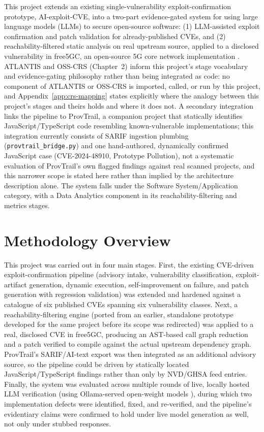 \documentclass[12pt,a4paper]{report}
\begin{document}
This project extends an existing single-vulnerability exploit-confirmation prototype, AI-exploit-CVE, into a two-part evidence-gated system for using large language models (LLMs) to secure open-source software: (1) LLM-assisted exploit confirmation and patch validation for already-published CVEs, and (2) reachability-filtered static analysis on real upstream source, applied to a disclosed vulnerability in free5GC, an open-source 5G core network implementation \cite{free5gc}. ATLANTIS and OSS-CRS (Chapter~2) inform this project's stage vocabulary and evidence-gating philosophy rather than being integrated as code: no component of ATLANTIS or OSS-CRS is imported, called, or run by this project, and Appendix~\ref{app:crs-mapping} states explicitly where the analogy between this project's stages and theirs holds and where it does not. A secondary integration links the pipeline to ProvTrail, a companion project that statically identifies JavaScript/TypeScript code resembling known-vulnerable implementations; this integration currently consists of SARIF ingestion plumbing (\texttt{provtrail\_bridge.py}) and one hand-authored, dynamically confirmed JavaScript case (CVE-2024-48910, Prototype Pollution), not a systematic evaluation of ProvTrail's own flagged findings against real scanned projects, and this narrower scope is stated here rather than implied by the architecture description alone. The system falls under the Software System/Application category, with a Data Analytics component in its reachability-filtering and metrics stages.

\section{Methodology Overview}
\label{sec:methodology-overview}

This project was carried out in four main stages. First, the existing CVE-driven exploit-confirmation pipeline (advisory intake, vulnerability classification, exploit-artifact generation, dynamic execution, self-improvement on failure, and patch generation with regression validation) was extended and hardened against a catalogue of six published CVEs spanning six vulnerability classes. Next, a reachability-filtering engine (ported from an earlier, standalone prototype developed for the same project before its scope was redirected) was applied to a real, disclosed CVE in free5GC, producing an AST-based call graph reduction and a patch verified to compile against the actual upstream dependency graph. ProvTrail's SARIF/AI-text export was then integrated as an additional advisory source, so the pipeline could be driven by statically located JavaScript/TypeScript findings rather than only by NVD/GHSA feed entries. Finally, the system was evaluated across multiple rounds of live, locally hosted LLM verification (using Ollama-served open-weight models \cite{ollama}), during which two implementation defects were identified, fixed, and re-verified, and the pipeline's evidentiary claims were confirmed to hold under live model generation as well, not only under stubbed responses.
\end{document}
